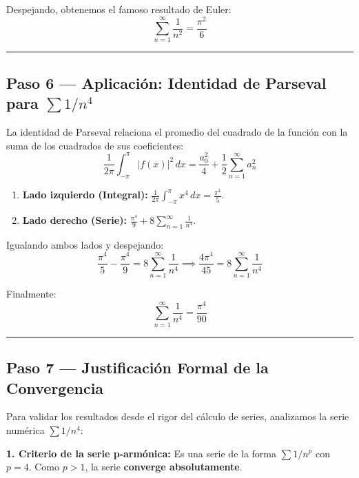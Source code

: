 \documentclass[
  letterpaper,
  DIV=11,
  numbers=noendperiod]{scrreprt}
\providecommand{\tightlist}{%
  \setlength{\itemsep}{0pt}\setlength{\parskip}{0pt}}
\begin{document}
Despejando, obtenemos el famoso resultado de Euler: \[
\boxed{\sum_{n=1}^{\infty}\frac{1}{n^2} = \frac{\pi^2}{6}}
\]

\begin{center}\rule{0.5\linewidth}{0.5pt}\end{center}

\subsection{\texorpdfstring{Paso 6 --- Aplicación: Identidad de Parseval
para
\(\sum 1/n^4\)}{Paso 6 --- Aplicación: Identidad de Parseval para \textbackslash sum 1/n\^{}4}}\label{paso-6-aplicaciuxf3n-identidad-de-parseval-para-sum-1n4}

La identidad de Parseval relaciona el promedio del cuadrado de la
función con la suma de los cuadrados de sus coeficientes: \[
\frac{1}{2\pi}\int_{-\pi}^{\pi} |f(x)|^2\,dx = \frac{a_0^2}{4} + \frac{1}{2}\sum_{n=1}^{\infty} a_n^2
\]

\begin{enumerate}
\def\labelenumi{\arabic{enumi}.}
\tightlist
\item
  \textbf{Lado izquierdo (Integral):}
  \(\frac{1}{2\pi}\int_{-\pi}^{\pi} x^4\,dx = \frac{\pi^4}{5}\).
\item
  \textbf{Lado derecho (Serie):}
  \(\frac{\pi^4}{9} + 8\sum_{n=1}^{\infty} \frac{1}{n^4}\).
\end{enumerate}

Igualando ambos lados y despejando: \[
\frac{\pi^4}{5} - \frac{\pi^4}{9} = 8\sum_{n=1}^{\infty} \frac{1}{n^4} \implies \frac{4\pi^4}{45} = 8\sum_{n=1}^{\infty} \frac{1}{n^4}
\]

Finalmente: \[
\boxed{\sum_{n=1}^{\infty}\frac{1}{n^4} = \frac{\pi^4}{90}}
\]

\begin{center}\rule{0.5\linewidth}{0.5pt}\end{center}

\subsection{Paso 7 --- Justificación Formal de la
Convergencia}\label{paso-7-justificaciuxf3n-formal-de-la-convergencia}

Para validar los resultados desde el rigor del cálculo de series,
analizamos la serie numérica \(\sum 1/n^4\):

\textbf{1. Criterio de la serie p-armónica:} Es una serie de la forma
\(\sum 1/n^p\) con \(p=4\). Como \(p > 1\), la serie \textbf{converge
absolutamente}.
\end{document}
